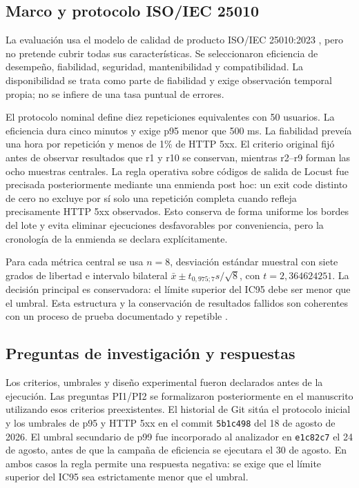 \subsection{Marco y protocolo ISO/IEC 25010}
\label{subsec:marco-iso25010}

La evaluación usa el modelo de calidad de producto ISO/IEC 25010:2023
\cite{iso25010_2023}, pero no pretende cubrir todas sus características. Se
seleccionaron eficiencia de desempeño, fiabilidad, seguridad, mantenibilidad y
compatibilidad. La disponibilidad se trata como parte de fiabilidad y exige
observación temporal propia; no se infiere de una tasa puntual de errores.

El protocolo nominal define diez repeticiones equivalentes con 50 usuarios. La
eficiencia dura cinco minutos y exige p95 menor que 500 ms. La fiabilidad
preveía una hora por repetición y menos de 1\% de HTTP 5xx. El criterio
original fijó antes de observar resultados que r1 y r10 se conservan, mientras
r2--r9 forman las ocho muestras centrales. La regla operativa sobre códigos de
salida de Locust fue precisada posteriormente mediante una enmienda post hoc:
un exit code distinto de cero no excluye por sí solo una repetición completa
cuando refleja precisamente HTTP 5xx observados. Esto conserva de forma
uniforme los bordes del lote y evita eliminar ejecuciones desfavorables por
conveniencia, pero la cronología de la enmienda se declara explícitamente.

Para cada métrica central se usa $n=8$, desviación estándar muestral con siete
grados de libertad e intervalo bilateral
$\bar{x}\pm t_{0,975;7}s/\sqrt{8}$, con $t=2,364624251$. La decisión principal
es conservadora: el límite superior del IC95 debe ser menor que el umbral. Esta
estructura y la conservación de resultados fallidos son coherentes con un
proceso de prueba documentado y repetible \cite{iso29119_2_2021}.

\subsection{Preguntas de investigación y respuestas}
\label{subsec:preguntas-investigacion}

Los criterios, umbrales y diseño experimental fueron declarados antes de la
ejecución. Las preguntas PI1/PI2 se formalizaron posteriormente en el manuscrito
utilizando esos criterios preexistentes. El historial de Git sitúa el protocolo
inicial y los umbrales de p95 y HTTP 5xx en el commit
\texttt{5b1c498} del 18 de agosto de 2026. El umbral secundario de p99 fue
incorporado al analizador en \texttt{e1c82c7} el 24 de agosto, antes de que la
campaña de eficiencia se ejecutara el 30 de agosto. En ambos casos la regla
permite una respuesta negativa: se exige que el límite superior del IC95 sea
estrictamente menor que el umbral.


